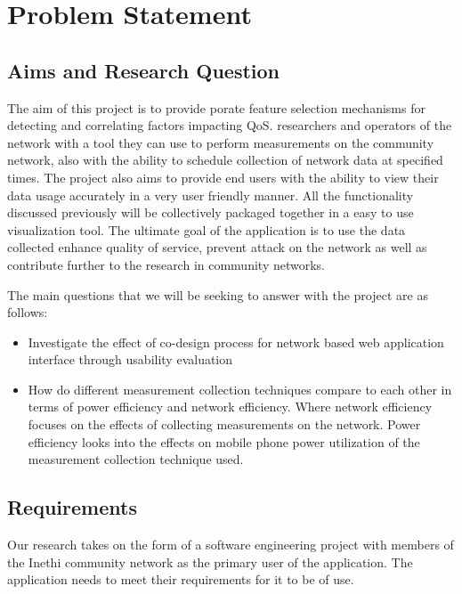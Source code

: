 \section{Problem Statement}
\subsection{Aims and Research Question}
The aim of this project is to provide porate feature selection mechanisms for detecting and correlating factors impacting QoS.
researchers and operators of the network with a tool they can use to perform measurements on the community network, also with the ability to schedule collection of network data at specified times. The project also aims to provide end users with the ability to view their data usage accurately in a very user friendly manner. All the functionality discussed previously will be collectively packaged together in a easy to use visualization tool. The ultimate goal of the application is to use the data collected enhance quality of service, prevent attack on the network as well as contribute further to the research in community networks.

The main questions that we will be seeking to answer with the project are as follows:
\begin{itemize}
	\item Investigate the effect of co-design process for network based web application interface through usability evaluation 
	\item How do different measurement collection techniques compare to each other in terms of power efficiency and network efficiency. Where network efficiency focuses on the effects of collecting measurements on the network. Power efficiency looks into the effects on mobile phone power utilization of the measurement collection technique used.
\end{itemize}
\subsection{Requirements}
Our research takes on the form of a software engineering project with members of the Inethi community network as the primary user of the application. The application needs to meet their requirements for it to be of use.
